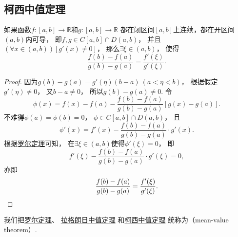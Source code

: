 \subsection{柯西中值定理}
\begin{theorem}[柯西中值定理]\label{theorem:微分中值定理.柯西中值定理}
如果函数\(f\colon[a,b]\to\mathbb{R}\)和\(g\colon[a,b]\to\mathbb{R}\)
都在闭区间\([a,b]\)上连续，都在开区间\((a,b)\)内可导，
即\(f,g \in C[a,b] \cap D(a,b)\)，
并且\((\forall x\in(a,b))[g'(x) \neq 0]\)，
那么\(\exists\xi\in(a,b)\)，
使得\begin{equation}
	\frac{f(b)-f(a)}{g(b)-g(a)}=\frac{f'(\xi)}{g'(\xi)}.
\end{equation}
\begin{proof}
因为\(g(b)-g(a)=g'(\eta)(b-a)\ (a<\eta<b)\)，
根据假定\(g'(\eta)\neq0\)，
又\(b-a\neq0\)，
所以\(g(b)-g(a)\neq0\).
令\begin{equation*}
	\phi(x)=f(x)-f(a)-\frac{f(b)-f(a)}{g(b)-g(a)}[g(x)-g(a)].
\end{equation*}
不难得\(\phi(a)=\phi(b)=0\)，
\(\phi\in C[a,b]\cap D(a,b)\)，
且\begin{equation*}
	\phi'(x)=f'(x)-\frac{f(b)-f(a)}{g(b)-g(a)}\cdot g'(x).
\end{equation*}
根据\hyperref[theorem:微分中值定理.罗尔定理]{罗尔定理}可知，
在\(\exists\xi\in(a,b)\)使得\(\phi'(\xi)=0\)，
即\begin{equation*}
	f'(\xi)-\frac{f(b)-f(a)}{g(b)-g(a)}\cdot g'(\xi)=0,
\end{equation*}
亦即\begin{equation*}
	\frac{f(b)-f(a)}{g(b)-g(a)}=\frac{f'(\xi)}{g'(\xi)}.
	\qedhere
\end{equation*}
\end{proof}
\end{theorem}

我们把\hyperref[theorem:微分中值定理.罗尔定理]{罗尔定理}、
\hyperref[theorem:微分中值定理.拉格朗日中值定理]{拉格朗日中值定理}%
和\hyperref[theorem:微分中值定理.柯西中值定理]{柯西中值定理}%
统称为（mean-value theorem）.

